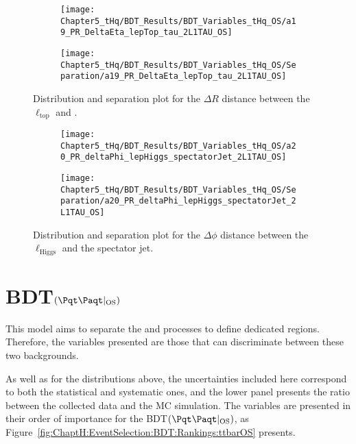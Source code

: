 \begin{figure}[h]
\centering
\begin{subfigure}{.45\textwidth}
  \centering
  \texttt{[image: Chapter5\_tHq/BDT\_Results/BDT\_Variables\_tHq\_OS/a19\_PR\_DeltaEta\_lepTop\_tau\_2L1TAU\_OS]}
\end{subfigure}%
\begin{subfigure}{.55\textwidth}
  \centering
  \texttt{[image: Chapter5\_tHq/BDT\_Results/BDT\_Variables\_tHq\_OS/Separation/a19\_PR\_DeltaEta\_lepTop\_tau\_2L1TAU\_OS]}
\end{subfigure}
\caption{Distribution and separation plot for the $\Delta R$ distance between the $\ell_{\text{top}}$ and \tauhad.}
\label{fig:Appendix:BDTVARS:tHqOS:a19_PR_DeltaEta_lepTop_tau}
\end{figure}

\begin{figure}[h]
\centering
\begin{subfigure}{.45\textwidth}
  \centering
  \texttt{[image: Chapter5\_tHq/BDT\_Results/BDT\_Variables\_tHq\_OS/a20\_PR\_deltaPhi\_lepHiggs\_spectatorJet\_2L1TAU\_OS]}
\end{subfigure}%
\begin{subfigure}{.55\textwidth}
  \centering
  \texttt{[image: Chapter5\_tHq/BDT\_Results/BDT\_Variables\_tHq\_OS/Separation/a20\_PR\_deltaPhi\_lepHiggs\_spectatorJet\_2L1TAU\_OS]}
\end{subfigure}
\caption{Distribution and separation plot for the $\Delta \phi$ distance between the $\ell_{\text{Higgs}}$ and
the spectator jet.}
\label{fig:Appendix:BDTVARS:tHqOS:a20_PR_deltaPhi_lepHiggs_spectatorJet}
\end{figure}

\FloatBarrier


\section{BDT$(\ttbar|_{\text{OS}})$}
\label{chap:Appendix:BDT_Variables:OS_ttbar}
This model aims to separate the \ttbar and \Zjets processes to 
define dedicated regions. Therefore, the variables presented are those that
can discriminate between these two backgrounds.


As well as for the distributions above, the uncertainties included here correspond
to both the statistical and systematic ones, and the lower panel presents the ratio 
between the collected data and the MC simulation. 
The variables are presented in their order of importance for the BDT$(\ttbar|_{\text{OS}})$, as
Figure~\ref{fig:ChaptH:EventSelection:BDT:Rankings:ttbarOS} presents. 

